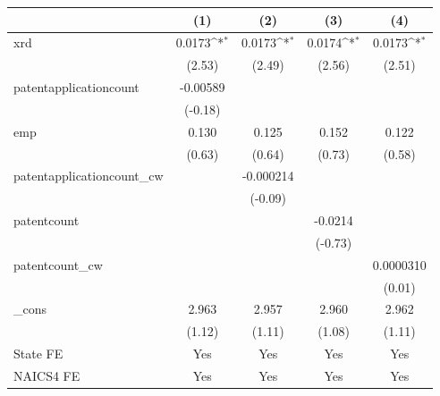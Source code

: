 {
\def\sym#1{\ifmmode^{#1}\else\(^{#1}\)\fi}
\begin{tabular}{l*{4}{c}}
\hline\hline
            &\multicolumn{1}{c}{(1)}         &\multicolumn{1}{c}{(2)}         &\multicolumn{1}{c}{(3)}         &\multicolumn{1}{c}{(4)}         \\
\hline
xrd         &      0.0173\sym{*}  &      0.0173\sym{*}  &      0.0174\sym{*}  &      0.0173\sym{*}  \\
            &      (2.53)         &      (2.49)         &      (2.56)         &      (2.51)         \\
[1em]
patentapplicationcount&    -0.00589         &                     &                     &                     \\
            &     (-0.18)         &                     &                     &                     \\
[1em]
emp         &       0.130         &       0.125         &       0.152         &       0.122         \\
            &      (0.63)         &      (0.64)         &      (0.73)         &      (0.58)         \\
[1em]
patentapplicationcount\_cw&                     &   -0.000214         &                     &                     \\
            &                     &     (-0.09)         &                     &                     \\
[1em]
patentcount &                     &                     &     -0.0214         &                     \\
            &                     &                     &     (-0.73)         &                     \\
[1em]
patentcount\_cw&                     &                     &                     &   0.0000310         \\
            &                     &                     &                     &      (0.01)         \\
[1em]
\_cons      &       2.963         &       2.957         &       2.960         &       2.962         \\
            &      (1.12)         &      (1.11)         &      (1.08)         &      (1.11)         \\
[1em]
State FE    &         Yes         &         Yes         &         Yes         &         Yes         \\
[1em]
NAICS4 FE   &         Yes         &         Yes         &         Yes         &         Yes         \\

\end{tabular}}
